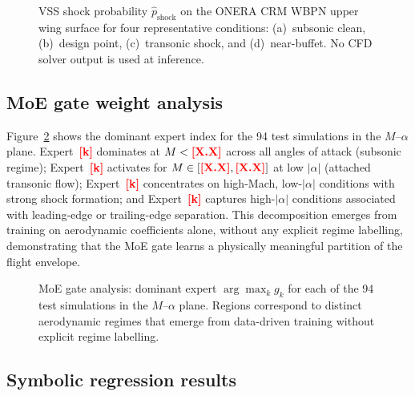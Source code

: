 \documentclass{WCCM-ECCOMAS_2026_Full_Paper}
\newcommand{\result}[1]{\textcolor{red}{\textbf{[#1]}}}
\newcommand{\figplaceholder}[1]{%
  \fbox{\parbox{0.95\linewidth}{\centering\vspace{1.5cm}%
  \textit{\small [Figure placeholder: #1]}\vspace{1.5cm}}}%
}
\begin{document}
\begin{figure}[ht]
\centering
\figplaceholder{$2{\times}2$ panel: shock probability $\hat{p}_{\mathrm{shock}}$ on CRM WBPN upper surface for (a)~$M{=}0.5$, $\alpha{=}2^{\circ}$; (b)~$M{=}0.78$, $\alpha{=}3^{\circ}$; (c)~$M{=}0.82$, $\alpha{=}5^{\circ}$; (d)~$M{=}0.85$, $\alpha{=}8^{\circ}$.  Colour scale 0 (blue) to 1 (red).}
\caption{VSS shock probability $\hat{p}_{\mathrm{shock}}$ on the ONERA
  CRM WBPN upper wing surface for four representative conditions:
  (a)~subsonic clean, (b)~design point, (c)~transonic shock, and
  (d)~near-buffet.  No CFD solver output is used at inference.}
\label{fig:shockmap}
\end{figure}

\subsection{MoE gate weight analysis}
\label{sec:gateanalysis}

Figure~\ref{fig:gate} shows the dominant expert index for the 94 test
simulations in the $M$--$\alpha$ plane.  Expert~\result{k} dominates
at $M < \result{X.X}$ across all angles of attack (subsonic regime);
Expert~\result{k} activates for $M\in[\result{X.X},\result{X.X}]$
at low $|\alpha|$ (attached transonic flow); Expert~\result{k}
concentrates on high-Mach, low-$|\alpha|$ conditions with strong
shock formation; and Expert~\result{k} captures high-$|\alpha|$
conditions associated with leading-edge or trailing-edge separation.
This decomposition emerges from training on aerodynamic coefficients
alone, without any explicit regime labelling, demonstrating that the
MoE gate learns a physically meaningful partition of the flight
envelope.

\begin{figure}[ht]
\centering
\figplaceholder{Scatter plot: dominant expert index (colour-coded, $k=1$--$4$) for 94 test simulations in the $M$--$\alpha$ plane.  Overlay contour lines separating expert regions.}
\caption{MoE gate analysis: dominant expert $\arg\max_k g_{k}$ for
  each of the 94 test simulations in the $M$--$\alpha$ plane.
  Regions correspond to distinct aerodynamic regimes that emerge from
  data-driven training without explicit regime labelling.}
\label{fig:gate}
\end{figure}

\subsection{Symbolic regression results}
\end{document}
